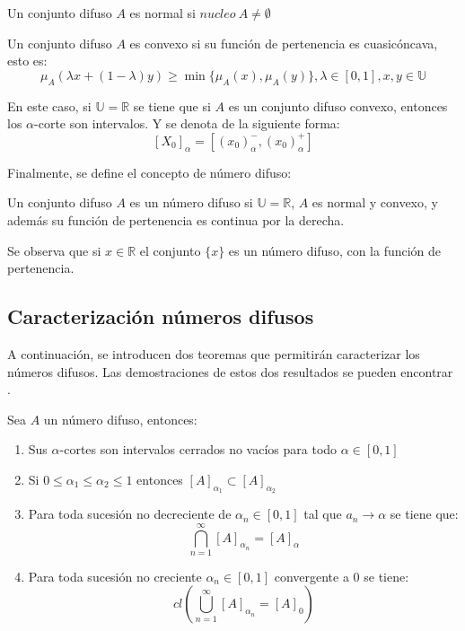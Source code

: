 \begin{definicion}
	\label{def:difuso_normal}
	Un conjunto difuso $A$ es normal si $nucleo ~ A \neq \emptyset$
\end{definicion}

\begin{definicion}
	\label{def:difuso_convexo}
	Un conjunto difuso $A$ es convexo si su función de pertenencia es cuasicóncava, esto es:
	\[
		\mu_A(\lambda x + (1-\lambda)y) \geq \min{\{\mu_A(x), \mu_A(y)\}}, \lambda \in [0, 1], x, y \in \mathbb{U}
	\]
\end{definicion}

En este caso, si $\mathbb{U}=\mathbb{R}$ se tiene que si $A$ es un conjunto difuso convexo, entonces los $\alpha$-corte son intervalos. Y se denota de la siguiente forma:
\[
	[X_0]_\alpha = [(x_0)_\alpha^- , (x_0)_\alpha^+]
\]

Finalmente, se define el concepto de número difuso:

\begin{definicion}
	\label{def:numero_difuso}
	Un conjunto difuso $A$ es un número difuso si $\mathbb{U}=\mathbb{R}$, $A$ es normal y convexo, y además su función de pertenencia es continua por la derecha.
\end{definicion}


Se observa que si $x \in \mathbb{R}$ el conjunto $\{x\}$ es un número difuso, con la función de pertenencia.


\subsection{Caracterización números difusos}
A continuación, se introducen dos teoremas que permitirán caracterizar los números difusos. Las demostraciones de estos dos resultados se pueden encontrar \cite{apuntesfuzzy}.

\begin{teorema}
	Sea $A$ un número difuso, entonces:
	\begin{enumerate}
		\item Sus $\alpha$-cortes son intervalos cerrados no vacíos para todo $\alpha \in [0, 1]$
		\item Si $0 \leq \alpha_1 \leq \alpha_2 \leq 1$ entonces $[A]_{\alpha_1} \subset [A]_{\alpha_2}$
		\item Para toda sucesión no decreciente de $\alpha_n \in [0, 1]$ tal que $a_n \longrightarrow \alpha$ se tiene que:
		\[
			\bigcap^\infty_{n=1} [A]_{\alpha_n} = [A]_\alpha
		\]
		\item Para toda sucesión no creciente $\alpha_n \in [0, 1]$ convergente a $0$ se tiene:
		\[
			cl\left(
				\bigcup^\infty_{n=1} [A]_{\alpha_n} = [A]_0
			\right)
		\]
	\end{enumerate}
\end{teorema}

